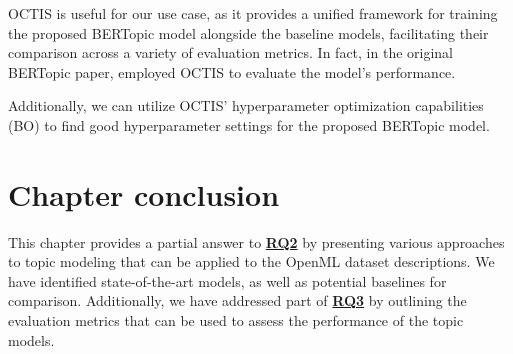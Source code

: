 OCTIS is useful for our use case, as it provides a unified framework for training the proposed BERTopic model alongside the baseline models, facilitating their comparison across a variety of evaluation metrics. In fact, in the original BERTopic paper, \citet{grootendorst_bertopic_2022} employed OCTIS to evaluate the model's performance.

Additionally, we can utilize OCTIS' hyperparameter optimization capabilities (BO) to find good hyperparameter settings for the proposed BERTopic model.

\section{Chapter conclusion}
This chapter provides a partial answer to \hyperref[rq2]{\textbf{RQ2}} by presenting various approaches to topic modeling that can be applied to the OpenML dataset descriptions. We have identified state-of-the-art models, as well as potential baselines for comparison. Additionally, we have addressed part of \hyperref[rq3]{\textbf{RQ3}} by outlining the evaluation metrics that can be used to assess the performance of the topic models.